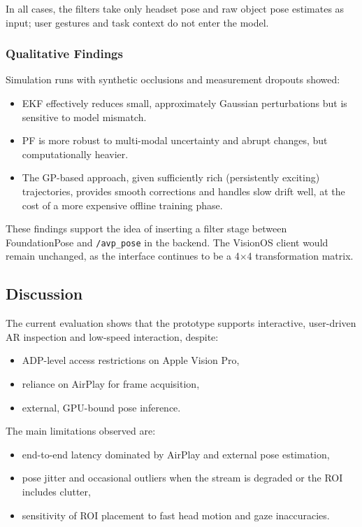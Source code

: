 In all cases, the filters take only headset pose and raw object pose estimates as input; user gestures and task context do not enter the model.

\subsubsection{Qualitative Findings}

Simulation runs with synthetic occlusions and measurement dropouts showed:

\begin{itemize}
    \item EKF effectively reduces small, approximately Gaussian perturbations but is sensitive to model mismatch.
    \item PF is more robust to multi-modal uncertainty and abrupt changes, but computationally heavier.
    \item The GP-based approach, given sufficiently rich (persistently exciting) trajectories, provides smooth corrections and handles slow drift well, at the cost of a more expensive offline training phase.
\end{itemize}

These findings support the idea of inserting a filter stage between FoundationPose and \texttt{/avp\_pose} in the backend. The VisionOS client would remain unchanged, as the interface continues to be a 4$\times$4 transformation matrix.

\subsection{Discussion}

The current evaluation shows that the prototype supports interactive, user-driven AR inspection and low-speed interaction, despite:

\begin{itemize}
    \item ADP-level access restrictions on Apple Vision Pro,
    \item reliance on AirPlay for frame acquisition,
    \item external, GPU-bound pose inference.
\end{itemize}

The main limitations observed are:

\begin{itemize}
    \item end-to-end latency dominated by AirPlay and external pose estimation,
    \item pose jitter and occasional outliers when the stream is degraded or the ROI includes clutter,
    \item sensitivity of ROI placement to fast head motion and gaze inaccuracies.
\end{itemize}


